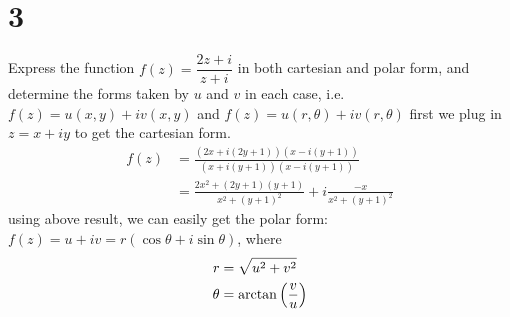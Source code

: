 \documentclass{article}
\begin{document}
\section*{3}
\begin{myleftlinebox}
    Express the function \(f(z)=\dfrac{2z+i}{z+i}\) in both cartesian and polar form, and determine the forms taken by \(u\) and \(v\) in each case, i.e. \(f(z)=u(x,y)+iv(x,y)\) and \(f(z) = u(r,\theta)+iv(r,\theta)\)
    \tcbline
    first we plug in \(z=x+iy\) to get the cartesian form.
    \begin{equation}
        \begin{split}
            f(z) &= \frac{(2x+i(2y+1))(x-i(y+1))}{(x+i(y+1))(x-i(y+1))}\\
            &= \frac{2x^2+(2y+1)(y+1)}{x^2+(y+1)^2}+i\frac{-x}{x^2+(y+1)^2}
        \end{split}
    \end{equation}
    using above result, we can easily get the polar form: \(f(z)=u+iv=r(\cos\theta+i\sin\theta)\), where
    \begin{align*}
        r &= \sqrt{u^2+v^2}\\
        \theta &= \arctan\left( \frac{v}{u} \right)
    \end{align*}
\end{myleftlinebox}
\end{document}

